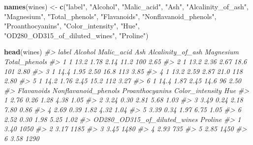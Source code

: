 \documentclass[]{book}
\newenvironment{Shaded}{\begin{snugshade}}{\end{snugshade}}
\newcommand{\CommentTok}[1]{\textcolor[rgb]{0.56,0.35,0.01}{\textit{#1}}}
\newcommand{\KeywordTok}[1]{\textcolor[rgb]{0.13,0.29,0.53}{\textbf{#1}}}
\newcommand{\NormalTok}[1]{#1}
\newcommand{\StringTok}[1]{\textcolor[rgb]{0.31,0.60,0.02}{#1}}
\begin{document}
\begin{Shaded}
\begin{Highlighting}[]
\KeywordTok{names}\NormalTok{(wines) <-}\StringTok{ }\KeywordTok{c}\NormalTok{(}\StringTok{"label"}\NormalTok{,}
                  \StringTok{"Alcohol"}\NormalTok{,}
                  \StringTok{"Malic_acid"}\NormalTok{,}
                  \StringTok{"Ash"}\NormalTok{,}
                  \StringTok{"Alcalinity_of_ash"}\NormalTok{,}
                  \StringTok{"Magnesium"}\NormalTok{,}
                  \StringTok{"Total_phenols"}\NormalTok{,}
                  \StringTok{"Flavanoids"}\NormalTok{,}
                  \StringTok{"Nonflavanoid_phenols"}\NormalTok{,}
                  \StringTok{"Proanthocyanins"}\NormalTok{,}
                  \StringTok{"Color_intensity"}\NormalTok{,}
                  \StringTok{"Hue"}\NormalTok{,}
                  \StringTok{"OD280_OD315_of_diluted_wines"}\NormalTok{,}
                  \StringTok{"Proline"}\NormalTok{)}
\end{Highlighting}
\end{Shaded}

\begin{Shaded}
\begin{Highlighting}[]
\KeywordTok{head}\NormalTok{(wines)}
\CommentTok{#>   label Alcohol Malic_acid  Ash Alcalinity_of_ash Magnesium Total_phenols}
\CommentTok{#> 1     1    13.2       1.78 2.14              11.2       100          2.65}
\CommentTok{#> 2     1    13.2       2.36 2.67              18.6       101          2.80}
\CommentTok{#> 3     1    14.4       1.95 2.50              16.8       113          3.85}
\CommentTok{#> 4     1    13.2       2.59 2.87              21.0       118          2.80}
\CommentTok{#> 5     1    14.2       1.76 2.45              15.2       112          3.27}
\CommentTok{#> 6     1    14.4       1.87 2.45              14.6        96          2.50}
\CommentTok{#>   Flavanoids Nonflavanoid_phenols Proanthocyanins Color_intensity  Hue}
\CommentTok{#> 1       2.76                 0.26            1.28            4.38 1.05}
\CommentTok{#> 2       3.24                 0.30            2.81            5.68 1.03}
\CommentTok{#> 3       3.49                 0.24            2.18            7.80 0.86}
\CommentTok{#> 4       2.69                 0.39            1.82            4.32 1.04}
\CommentTok{#> 5       3.39                 0.34            1.97            6.75 1.05}
\CommentTok{#> 6       2.52                 0.30            1.98            5.25 1.02}
\CommentTok{#>   OD280_OD315_of_diluted_wines Proline}
\CommentTok{#> 1                         3.40    1050}
\CommentTok{#> 2                         3.17    1185}
\CommentTok{#> 3                         3.45    1480}
\CommentTok{#> 4                         2.93     735}
\CommentTok{#> 5                         2.85    1450}
\CommentTok{#> 6                         3.58    1290}
\end{Highlighting}
\end{Shaded}
\end{document}
